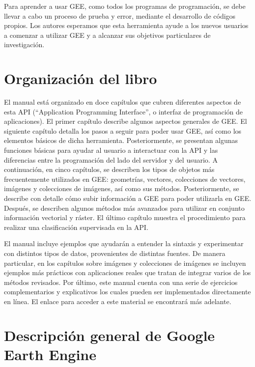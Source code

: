 \documentclass[
  12pt,
  letterpaper,
  twoside]{book}
\begin{document}
Para aprender a usar GEE, como todos los programas de programación, se debe llevar a cabo un proceso de prueba y error, mediante el desarrollo de códigos propios. Los autores esperamos que esta herramienta ayude a los nuevos usuarios a comenzar a utilizar GEE y a alcanzar sus objetivos particulares de investigación.

\hypertarget{organizaciuxf3n-del-libro}{%
\section{Organización del libro}\label{organizaciuxf3n-del-libro}}

El manual está organizado en doce capítulos que cubren diferentes aspectos de esta API (``Application Programming Interface'', o interfaz de programación de aplicaciones). El primer capítulo describe algunos aspectos generales de GEE. El siguiente capítulo detalla los pasos a seguir para poder usar GEE, así como los elementos básicos de dicha herramienta. Posteriormente, se presentan algunas funciones básicas para ayudar al usuario a interactuar con la API y las diferencias entre la programación del lado del servidor y del usuario. A continuación, en cinco capítulos, se describen los tipos de objetos más frecuentemente utilizados en GEE: geometrías, vectores, colecciones de vectores, imágenes y colecciones de imágenes, así como sus métodos. Posteriormente, se describe con detalle cómo subir información a GEE para poder utilizarla en GEE. Después, se describen algunos métodos más avanzados para utilizar en conjunto información vectorial y ráster. El último capítulo muestra el procedimiento para realizar una clasificación supervisada en la API.

El manual incluye ejemplos que ayudarán a entender la sintaxis y experimentar con distintos tipos de datos, provenientes de distintas fuentes. De manera particular, en los capítulos sobre imágenes y colecciones de imágenes se incluyen ejemplos más prácticos con aplicaciones reales que tratan de integrar varios de los métodos revisados. Por último, este manual cuenta con una serie de ejercicios complementarios y explicativos los cuales pueden ser implementados directamente en línea. El enlace para acceder a este material se encontrará más adelante.

\hypertarget{descripciuxf3n-general-de-google-earth-engine}{%
\section{Descripción general de Google Earth Engine}\label{descripciuxf3n-general-de-google-earth-engine}}
\end{document}
